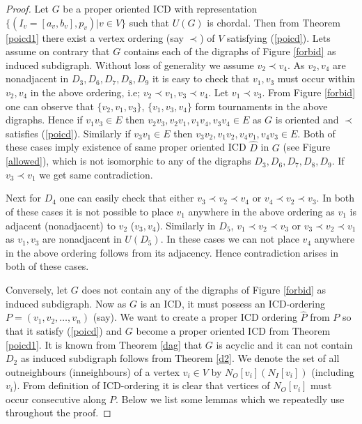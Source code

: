 \documentclass{article}
\theoremstyle{definition}
\numberwithin{equation}{section}
\begin{document}
\begin{proof}
Let $G$ be a proper oriented ICD with representation $\{(I_{v}=[a_{v},b_{v}],p_{v})|v\in V\}$ such that $U(G)$ is chordal. Then from Theorem \ref{poicd1} there exist a vertex ordering (say $\prec$) of $V$ satisfying (\ref{poicd}). Lets assume on contrary that $G$ contains each of the digraphs of Figure \ref{forbid} as induced subdigraph. Without loss of generality we assume $v_{2}\prec v_{4}$. As $v_{2},v_{4}$ are nonadjacent in $D_{3}, D_{6}, D_{7}, D_{8}, D_{9}$ it is easy to check that $v_{1},v_{3}$ must occur within $v_{2},v_{4}$ in the above ordering, i.e; $v_{2}\prec v_{1},v_{3}\prec v_{4}$. Let $v_{1}\prec v_{3}$. From Figure \ref{forbid} one can observe that $\{v_{2},v_{1},v_{3}\}$, $\{v_{1},v_{3},v_{4}\}$ form tournaments in the above digraphs. Hence if $v_{1}v_{3}\in E$ then $v_{2}v_{3},v_{2}v_{1},v_{1}v_{4},v_{3}v_{4}\in E$ as $G$ is oriented and $\prec$ satisfies (\ref{poicd}).
Similarly if $v_{3}v_{1}\in E$ then $v_{3}v_{2},v_{1}v_{2},v_{4}v_{1},v_{4}v_{3}\in E$. Both of these cases imply existence of same proper oriented ICD $\hat{D}$ in $G$ (see Figure \ref{allowed}), which is not isomorphic to any of the digraphs $D_{3}, D_{6}, D_{7}, D_{8}, D_{9}$. If $v_{3}\prec v_{1}$ we get same contradiction. 

\noindent Next for $D_{4}$ one can easily check that either $v_{3}\prec v_{2}\prec v_{4}$ or $v_{4}\prec v_{2}\prec v_{3}$. In both of these cases it is not possible to place $v_{1}$ anywhere in the above ordering as $v_{1}$ is adjacent (nonadjacent) to $v_{2}$ ($v_{3},v_{4}$). Similarly in $D_{5}$, $v_{1}\prec v_{2}\prec v_{3}$ or $v_{3}\prec v_{2}\prec v_{1}$ as $v_{1},v_{3}$ are nonadjacent in $U(D_{5})$. In these cases we can not place $v_{4}$ anywhere in the above ordering follows from its adjacency. Hence contradiction arises in both of these cases.

 
\vspace{0.3em}

\noindent Conversely, let $G$ does not contain any of the digraphs of Figure \ref{forbid} as induced subdigraph. Now as $G$ is an ICD, it must possess an ICD-ordering $P=(v_{1},v_{2},\hdots,v_{n})$ (say). We want to create a proper ICD ordering $\hat{P}$ from $P$ so that it satisfy (\ref{poicd}) and $G$ become a proper oriented ICD from Theorem \ref{poicd1}. It is known from Theorem \ref{dag} that $G$ is acyclic and it can not contain $D_{2}$ as induced subdigraph follows from Theorem \ref{d2}.
We denote the set of all outneighbours (inneighbours) of a vertex $v_{i}\in V$ by $N_{O}[v_{i}](N_{I}[v_{i}])$ (including $v_{i}$). From definition of ICD-ordering it is clear that vertices of $N_{O}[v_{i}]$ must occur consecutive along $P$. Below we list some lemmas which we repeatedly use throughout the proof.


\end{proof}
\end{document}
